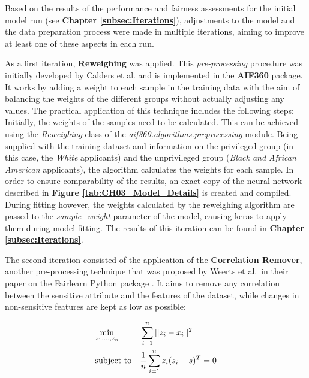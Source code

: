 
Based on the results of the performance and fairness assessments for the initial model run (see \textbf{Chapter \ref{subsec:Iterations}}), adjustments to the model and the data preparation process were made in multiple iterations, aiming to improve at least one of these aspects in each run.

As a first iteration, \textbf{Reweighing} was applied. This \textit{pre-processing} procedure was initially developed by Calders et al. \parencite{Calders2009} and is implemented in the \textbf{AIF360} package. It works by adding a weight to each sample in the training data with the aim of balancing the weights of the different groups without actually adjusting any values.
The practical application of this technique includes the following steps: Initially, the weights of the samples need to be calculated. This can be achieved using the \textit{Reweighing} class of the \textit{aif360.algorithms.preprocessing} module. Being supplied with the training dataset and information on the privileged group (in this case, the \textit{White} applicants) and the unprivileged group (\textit{Black and African American} applicants), the algorithm calculates the weights for each sample. 
In order to ensure comparability of the results, an exact copy of the neural network described in \textbf{Figure \ref{tab:CH03_Model_Details}} is created and compiled. During fitting however, the weights calculated by the reweighing algorithm are passed to the \textit{sample\_weight} parameter of the model, causing keras to apply them during model fitting. The results of this iteration can be found in \textbf{Chapter \ref{subsec:Iterations}}.

The second iteration consisted of the application of the \textbf{Correlation Remover}, another pre-processing technique that was proposed by Weerts et al.\ in their paper on the Fairlearn Python package \parencite{Weerts2023}. It aims to remove any correlation between the sensitive attribute and the features of the dataset, while changes in non-sensitive features are kept as low as possible:

\begin{equation}
    \begin{aligned}
        & \underset{z_1, \ldots, z_n}{\text{min}}
        & & \sum_{i=1}^n ||z_i - x_i||^2 \\
        & \text{subject to}
        & & \frac{1}{n} \sum_{i=1}^n z_i (s_i - \bar{s})^T = 0
        \end{aligned}
    \label{eq:Correlation_Remover}
    \addcontentsline{frm}{formulas}{\protect\numberline{\theequation}\hspace{1em}Correlation Remover}
\end{equation}

